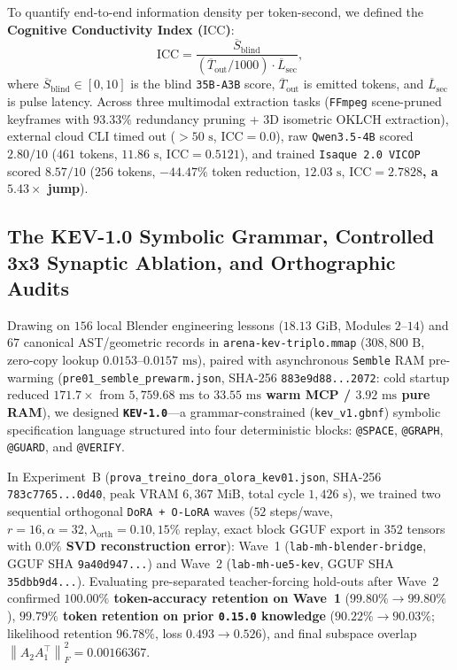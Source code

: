 \documentclass[10pt,a4paper]{article}
\begin{document}
To quantify end-to-end information density per token-second, we defined the \textbf{Cognitive Conductivity Index ($\mathrm{ICC}$)}:
\begin{equation}
  \mathrm{ICC} = \frac{\overline{S}_{\text{blind}}}{\left(\overline{T}_{\text{out}} / 1000\right) \cdot \overline{L}_{\text{sec}}},
  \label{eq:icc}
\end{equation}
where $\overline{S}_{\text{blind}} \in [0,10]$ is the blind \texttt{35B-A3B} score, $\overline{T}_{\text{out}}$ is emitted tokens, and $\overline{L}_{\text{sec}}$ is pulse latency. Across three multimodal extraction tasks (\texttt{FFmpeg} scene-pruned keyframes with $93.33\%$ redundancy pruning + 3D isometric OKLCH extraction), external cloud CLI timed out ($>50\text{ s}$, $\mathrm{ICC}=0.0$), raw \texttt{Qwen3.5-4B} scored $2.80/10$ ($461$ tokens, $11.86\text{ s}$, $\mathrm{ICC}=0.5121$), and trained \texttt{Isaque 2.0 VICOP} scored \textbf{$8.57/10$} ($256$ tokens, $-44.47\%$ token reduction, $12.03\text{ s}$, \textbf{$\mathrm{ICC}=2.7828$, a $5.43\times$ jump}).

\subsection{The KEV-1.0 Symbolic Grammar, Controlled 3x3 Synaptic Ablation, and Orthographic Audits}

Drawing on $156$ local Blender engineering lessons ($18.13\text{ GiB}$, Modules $2\text{--}14$) and $67$ canonical AST/geometric records in \texttt{arena-kev-triplo.mmap} ($308,800\text{ B}$, zero-copy lookup \textbf{$0.0153\text{--}0.0157\text{ ms}$}), paired with asynchronous \texttt{Semble} RAM pre-warming (\texttt{pre01\_\allowbreak{}semble\_\allowbreak{}prewarm.json}, SHA-256 \texttt{883e9d88...2072}: cold startup reduced $171.7\times$ from $5,759.68\text{ ms}$ to \textbf{$33.55\text{ ms}$ warm MCP / $3.92\text{ ms}$ pure RAM}), we designed \textbf{\texttt{KEV-1.0}}---a grammar-constrained (\texttt{kev\_\allowbreak{}v1.gbnf}) symbolic specification language structured into four deterministic blocks: \texttt{@SPACE}, \texttt{@GRAPH}, \texttt{@GUARD}, and \texttt{@VERIFY}.

In Experiment~B (\texttt{prova\_\allowbreak{}treino\_\allowbreak{}dora\_\allowbreak{}olora\_\allowbreak{}kev01.json}, SHA-256 \texttt{783c7765...0d40}, peak VRAM $6,367\text{ MiB}$, total cycle $1,426\text{ s}$), we trained two sequential orthogonal \texttt{DoRA + O-LoRA} waves ($52$ steps/wave, $r=16, \alpha=32, \lambda_{\text{orth}}=0.10, 15\%$ replay, exact block GGUF export in $352$ tensors with \textbf{$0.0\%$ SVD reconstruction error}): Wave~1 (\texttt{lab-mh-blender-bridge}, GGUF SHA \texttt{9a40d947...}) and Wave~2 (\texttt{lab-mh-ue5-kev}, GGUF SHA \texttt{35dbb9d4...}). Evaluating pre-separated teacher-forcing hold-outs after Wave~2 confirmed \textbf{$100.00\%$ token-accuracy retention on Wave~1} ($99.80\% \to 99.80\%$), \textbf{$99.79\%$ token retention on prior \texttt{0.15.0} knowledge} ($90.22\% \to 90.03\%$; likelihood retention $96.78\%$, loss $0.493 \to 0.526$), and final subspace overlap $\left\|A_2 A_1^\top\right\|_F^2 = 0.00166367$.
\end{document}
